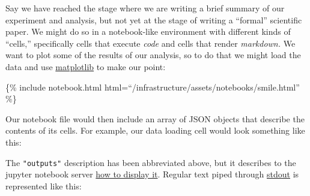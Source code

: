 Say we have reached the stage where we are writing a brief summary of
our experiment and analysis, but not yet at the stage of writing a
``formal'' scientific paper. We might do so in a notebook-like \citep{kluyverJupyterNotebooksPublishing2016}  environment with different
kinds of ``cells,'' specifically cells that execute \emph{code} and
cells that render \emph{markdown.} We want to plot some of the results
of our analysis, so to do that we might load the data and use
\href{https://matplotlib.org/}{matplotlib} \citep{hunterMatplotlib2DGraphics2007}  to make our point:

\{\% include notebook.html
html=``/infrastructure/assets/notebooks/smile.html'' \%\}

Our notebook file would then include an array of JSON objects that
describe the contents of its cells. For example, our data loading cell
would look something like this:

\begin{Shaded}
\begin{Highlighting}[]
\FunctionTok{\{}
   \FunctionTok{:} \FunctionTok{,}
   \FunctionTok{:} \FunctionTok{,}
   \FunctionTok{:} \FunctionTok{,}
   \FunctionTok{:} \FunctionTok{\{}
    \FunctionTok{:} 
   \FunctionTok{\},}
   \FunctionTok{:} \OtherTok{[}
   \OtherTok{]}\FunctionTok{,}
   \FunctionTok{:} \OtherTok{[}
   \OtherTok{]}
\FunctionTok{\}}
\end{Highlighting}
\end{Shaded}

The \texttt{"outputs"} description has been abbreviated above, but it
describes to the jupyter notebook server
\href{https://ipywidgets.readthedocs.io/en/latest/examples/Widget\%20Low\%20Level.html}{how
to display it}. Regular text piped through
\href{https://en.wikipedia.org/wiki/Standard_streams}{stdout} is
represented like this:

\begin{Shaded}
\begin{Highlighting}[]
\FunctionTok{\{}
  \FunctionTok{:} \FunctionTok{,}
  \FunctionTok{:} \FunctionTok{,}
  \FunctionTok{:} \OtherTok{[}
    \OtherTok{,}
  \OtherTok{]}
\FunctionTok{\}}
\end{Highlighting}
\end{Shaded}

